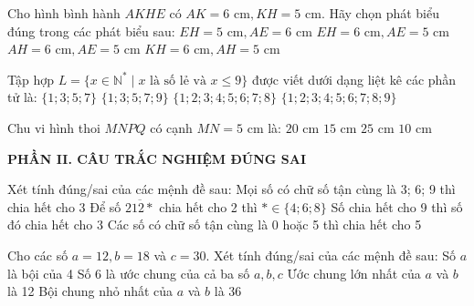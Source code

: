 \documentclass[12pt,a4paper]{article}
\begin{document}
\begin{ex}
Cho hình bình hành $AKHE$ có $AK = 6\text{ cm}, KH = 5\text{ cm}$. Hãy chọn phát biểu đúng trong các phát biểu sau:
\choice
{$EH = 5\text{ cm}, AE = 6\text{ cm}$}
{\True $EH = 6\text{ cm}, AE = 5\text{ cm}$}
{$AH = 6\text{ cm}, AE = 5\text{ cm}$}
{$KH = 6\text{ cm}, AH = 5\text{ cm}$}
\end{ex}

\begin{ex}
Tập hợp $L = \{x \in \mathbb{N}^* \mid x \text{ là số lẻ và } x \le 9\}$ được viết dưới dạng liệt kê các phần tử là:
\choice
{$\{1; 3; 5; 7\}$}
{\True $\{1; 3; 5; 7; 9\}$}
{$\{1; 2; 3; 4; 5; 6; 7; 8\}$}
{$\{1; 2; 3; 4; 5; 6; 7; 8; 9\}$}
\end{ex}

\begin{ex}
Chu vi hình thoi $MNPQ$ có cạnh $MN = 5\text{ cm}$ là:
\choice
{\True $20\text{ cm}$}
{$15\text{ cm}$}
{$25\text{ cm}$}
{$10\text{ cm}$}
\end{ex}


\setcounter{ex}{0}
\vspace{2mm}
\noindent\textbf{\large PHẦN II. CÂU TRẮC NGHIỆM ĐÚNG SAI}
\vspace{1mm}
\begin{ex}
Xét tính đúng/sai của các mệnh đề sau:
\choiceTF
{Mọi số có chữ số tận cùng là 3; 6; 9 thì chia hết cho 3}
{Để số $\overline{212*}$ chia hết cho 2 thì $* \in \{4; 6; 8\}$}
{\True Số chia hết cho 9 thì số đó chia hết cho 3}
{\True Các số có chữ số tận cùng là 0 hoặc 5 thì chia hết cho 5}
\end{ex}

\begin{ex}
Cho các số $a = 12, b = 18$ và $c = 30$. Xét tính đúng/sai của các mệnh đề sau:
\choiceTF
{\True Số $a$ là bội của 4}
{\True Số 6 là ước chung của cả ba số $a, b, c$}
{Ước chung lớn nhất của $a$ và $b$ là 12}
{\True Bội chung nhỏ nhất của $a$ và $b$ là 36}
\end{ex}
\end{document}
